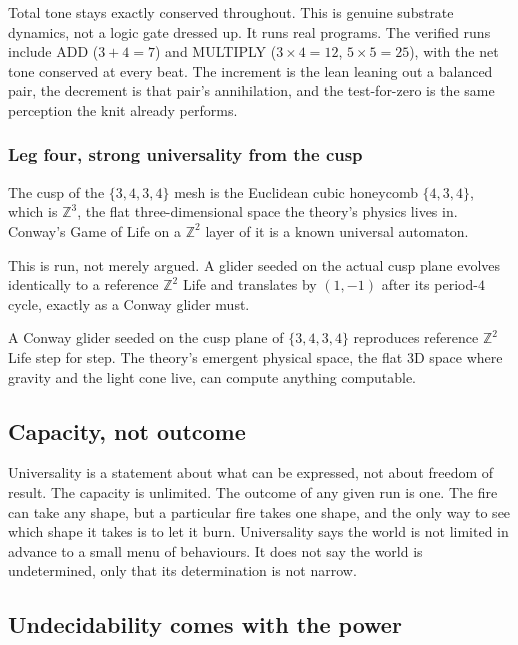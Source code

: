 Total tone stays exactly conserved throughout. This is genuine substrate dynamics, not a logic gate dressed up. It runs real programs. The verified runs include ADD ($3 + 4 = 7$) and MULTIPLY ($3 \times 4 = 12$, $5 \times 5 = 25$), with the net tone conserved at every beat. The increment is the lean leaning out a balanced pair, the decrement is that pair's annihilation, and the test-for-zero is the same perception the knit already performs.

\subsubsection{Leg four, strong universality from the cusp}

The cusp of the $\{3,4,3,4\}$ mesh is the Euclidean cubic honeycomb $\{4,3,4\}$, which is $\mathbb{Z}^3$, the flat three-dimensional space the theory's physics lives in. Conway's Game of Life on a $\mathbb{Z}^2$ layer of it is a known universal automaton.

This is run, not merely argued. A glider seeded on the actual cusp plane evolves identically to a reference $\mathbb{Z}^2$ Life and translates by $(1, -1)$ after its period-$4$ cycle, exactly as a Conway glider must.

\begin{result}
A Conway glider seeded on the cusp plane of $\{3,4,3,4\}$ reproduces reference $\mathbb{Z}^2$ Life step for step. The theory's emergent physical space, the flat $3$D space where gravity and the light cone live, can compute anything computable.
\end{result}

\subsection{Capacity, not outcome}

Universality is a statement about what can be expressed, not about freedom of result. The capacity is unlimited. The outcome of any given run is one. The fire can take any shape, but a particular fire takes one shape, and the only way to see which shape it takes is to let it burn. Universality says the world is not limited in advance to a small menu of behaviours. It does not say the world is undetermined, only that its determination is not narrow.

\subsection{Undecidability comes with the power}

